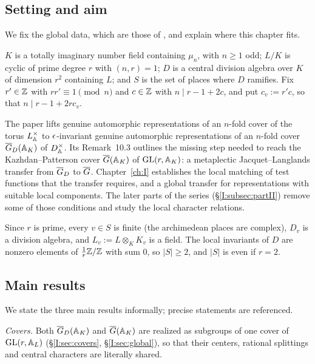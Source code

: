 \subsection{Setting and aim}\label{I:subsec:setting}
We fix the global data, which are those of \cite[\S1]{JC26a}, and explain where this chapter fits.

\begin{assumption}\label{I:ass:standing}
$K$ is a totally imaginary number field containing $\mu_n$, with $n\ge1$ odd; $L/K$ is cyclic of prime degree $r$ with $(n,r)=1$; $D$ is a central division algebra over $K$ of dimension $r^2$ containing $L$; and $S$ is the set of places where $D$ ramifies. Fix $r'\in\mathbb{Z}$ with $rr'\equiv1\pmod n$ and $c\in\mathbb{Z}$ with $n\mid r-1+2c$, and put $c_v:=r'c$, so that $n\mid r-1+2rc_v$.
\end{assumption}

The paper \cite{JC26a} lifts genuine automorphic representations of an $n$-fold cover of the torus $L^\times_{\mathbb{A}}$ to $\epsilon$-invariant genuine automorphic representations of an $n$-fold cover $\overline{G}_D(\mathbb{A}_K)$ of $D^\times_{\mathbb{A}}$. Its Remark~10.3 outlines the missing step needed to reach the Kazhdan--Patterson cover $\overline{G}(\mathbb{A}_K)$ of $\mathrm{GL}(r,\mathbb{A}_K)$: a metaplectic Jacquet--Langlands transfer from $\overline{G}_D$ to $\overline{G}$. Chapter~\ref{ch:I} establishes the local matching of test functions that the transfer requires, and a global transfer for representations with suitable local components. The later parts of the series (\S\ref{I:subsec:partII}) remove some of those conditions and study the local character relations.

Since $r$ is prime, every $v\in S$ is finite (the archimedean places are complex), $D_v$ is a division algebra, and $L_v:=L\otimes_KK_v$ is a field. The local invariants of $D$ are nonzero elements of $\frac1r\mathbb{Z}/\mathbb{Z}$ with sum $0$, so $|S|\ge2$, and $|S|$ is even if $r=2$.

\subsection{Main results}\label{I:subsec:mainresults}
We state the three main results informally; precise statements are referenced.

\emph{Covers.} Both $\overline{G}_D(\mathbb{A}_K)$ and $\overline{G}(\mathbb{A}_K)$ are realized as subgroups of one cover of $\mathrm{GL}(r,\mathbb{A}_L)$ (\S\ref{I:sec:covers}, \S\ref{I:sec:global}), so that their centers, rational splittings and central characters are literally shared.

